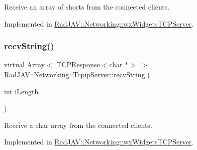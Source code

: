 Receive an array of shorts from the connected clients. 



Implemented in \mbox{\hyperlink{class_rad_j_a_v_1_1_networking_1_1wx_widgets_t_c_p_server_a20b5fdde0172e6e714cd54296b7cb0e4}{Rad\+J\+A\+V\+::\+Networking\+::wx\+Widgets\+T\+C\+P\+Server}}.

\mbox{\label{class_rad_j_a_v_1_1_networking_1_1_tcpip_server_aa610e07c79aa751e89621cd63df32c2b}} 
\subsubsection{\texorpdfstring{recv\+String()}{recvString()}\hspace{0.1cm}{\footnotesize\ttfamily [1/2]}}
{\footnotesize\ttfamily virtual \mbox{\hyperlink{class_rad_j_a_v_1_1_array}{Array}}$<$ \mbox{\hyperlink{class_rad_j_a_v_1_1_networking_1_1_t_c_p_response}{T\+C\+P\+Response}}$<$char $\ast$$>$ $>$ Rad\+J\+A\+V\+::\+Networking\+::\+Tcpip\+Server\+::recv\+String (\begin{DoxyParamCaption}\item[{int}]{i\+Length }\end{DoxyParamCaption})\hspace{0.3cm}{\ttfamily [pure virtual]}}



Receive a char array from the connected clients. 



Implemented in \mbox{\hyperlink{class_rad_j_a_v_1_1_networking_1_1wx_widgets_t_c_p_server_a3287134b3e032cfe794422652c0bcefe}{Rad\+J\+A\+V\+::\+Networking\+::wx\+Widgets\+T\+C\+P\+Server}}.

\mbox{\label{class_rad_j_a_v_1_1_networking_1_1_tcpip_server_a37673e5cbe7b29894edc663e5d6d80e4}} 
